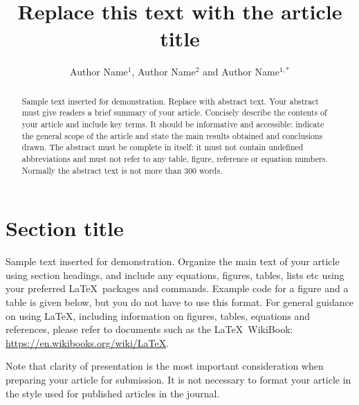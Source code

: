 \documentclass{iopjournal}
\begin{document}

\title{Replace this text with the article title}

\author{Author Name$^1$, Author Name$^2$ and Author Name$^{1,*}$}






\begin{abstract}
Sample text inserted for demonstration. Replace with abstract text. Your abstract must give readers a brief summary of your article. Concisely describe the contents of your article and include key terms. It should be informative and accessible: indicate the general scope of the article and state the main results obtained and conclusions drawn. The abstract must be complete in itself: it must not contain undefined abbreviations and must not refer to any table, figure, reference or equation numbers. Normally the abstract text is not more than 300 words.
\end{abstract}

\section{Section title}
Sample text inserted for demonstration\cite{zimmermann2024experimental,zhu2018structure}. Organize the main text of your article using section headings, and include any equations, figures, tables, lists etc using your preferred \LaTeX\ packages and commands. Example code for a figure and a table is given below, but you do not have to use this format. For general guidance on using \LaTeX , including information on figures, tables, equations and references, please refer to documents such as the \LaTeX\ WikiBook: \href{https://en.wikibooks.org/wiki/LaTeX}{https://en.wikibooks.org/wiki/LaTeX}.

Note that clarity of presentation\cite{zimmermann2024experimental} is the most important consideration when preparing your article for submission. It is not necessary to format your article in the style used for published articles in the journal.\cite{zonca2021nonlinear,zonca2009highfrequency,zonca2008structures,zimmermann2024experimental}
\end{document}

